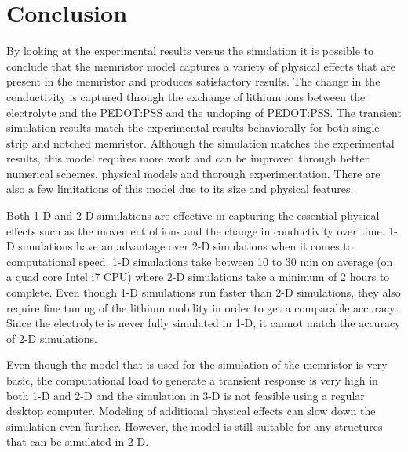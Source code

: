 
\chapter{Conclusion} %

\label{Chapter8} %


\begin{doublespace}

By looking at the experimental results versus the simulation it is possible to conclude that the memristor model captures a variety of physical effects that are present in the memristor and produces satisfactory results. The change in the conductivity is captured through the exchange of lithium ions between the electrolyte and the PEDOT:PSS and the undoping of PEDOT:PSS. The transient simulation results match the experimental results behaviorally for both single strip and notched memristor. Although the simulation matches the experimental results, this model requires more work and can be improved through better numerical schemes, physical models and thorough experimentation. There are also a few limitations of this model due to its size and physical features.

Both 1-D and 2-D simulations are effective in capturing the essential physical effects such as the movement of ions and the change in conductivity over time. 1-D simulations have an advantage over 2-D simulations when it comes to computational speed. 1-D simulations take between 10 to 30 min on average (on a quad core Intel i7 CPU) where 2-D simulations take a minimum of 2 hours to complete. Even though 1-D simulations run faster than 2-D simulations, they also require fine tuning of the lithium mobility in order to get a comparable accuracy. Since the electrolyte is never fully simulated in 1-D, it cannot match the accuracy of 2-D simulations.

Even though the model that is used for the simulation of the memristor is very basic, the computational load to generate a transient response is very high in both 1-D and 2-D and the simulation in 3-D is not feasible using a regular desktop computer. Modeling of additional physical effects can slow down the simulation even further. However, the model is still suitable for any structures that can be simulated in 2-D.  


\end{doublespace}
